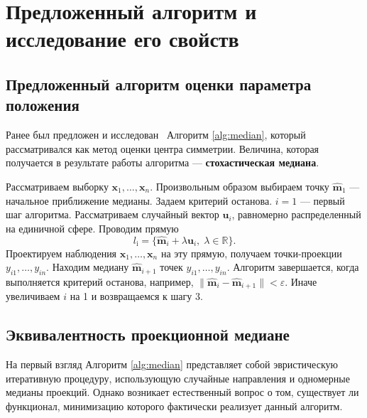 \chapter{Предложенный алгоритм и исследование его свойств}


\section{Предложенный алгоритм оценки параметра положения}

Ранее был предложен и исследован~\cite{filatova2024robust} Алгоритм \ref{alg:median}, который рассматривался как метод оценки центра симметрии. Величина, которая получается в результате работы алгоритма --- \textbf{стохастическая медиана}.

\begin{algorithm}[H]
\caption{Вычисление оценки некоторого обобщения многомерной медианы}
\begin{algorithmic}[1]
			\State Рассматриваем выборку $\mathbf{x}_1,\ldots,\mathbf{x}_{{n}}$. 
			\State Произвольным образом выбираем точку $\widehat{\mathbf{m}}_1$ --- начальное приближение медианы. Задаем критерий останова. $i=1$ --- первый шаг алгоритма. 
			\State Рассматриваем случайный вектор $\mathbf{u}_i$, равномерно распределенный на единичной сфере. Проводим прямую 
			\[l_{\text{i}}=\{\widehat{\mathbf{m}}_{{i}}+\lambda\mathbf{u}_{{i}},\;\lambda\in\mathbb{R}\}.\]
			\State Проектируем наблюдения $\mathbf{x}_1,\ldots,\mathbf{x}_{{n}}$ на эту прямую, получаем точки-проекции~$y_{i1},\ldots,y_{in}$.
			\State Находим медиану $\widehat{\mathbf{m}}_{{i+1}}$ точек $y_{{i1}},\ldots,y_{{in}}$. 
			\State Алгоритм завершается, когда выполняется критерий останова, например,  $\|\widehat{\mathbf{m}}_{{i}}-\widehat{\mathbf{m}}_{{i+1}}\|<\varepsilon$.  Иначе увеличиваем $i$ на 1 и возвращаемся к шагу 3.
\end{algorithmic}
\label{alg:median}
\end{algorithm}

\section{Эквивалентность проекционной медиане}

На первый взгляд Алгоритм \ref{alg:median} представляет собой эвристическую итеративную процедуру, использующую случайные направления и одномерные медианы проекций. Однако возникает естественный вопрос о том, существует ли функционал, минимизацию которого фактически реализует данный алгоритм.

